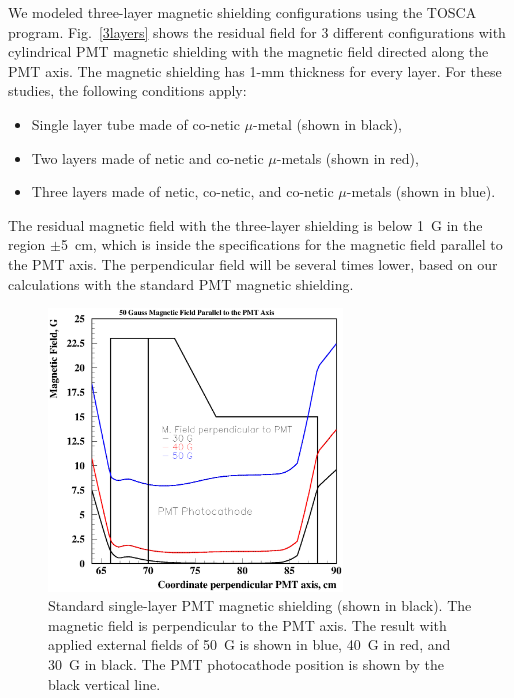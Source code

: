 We modeled three-layer magnetic shielding configurations using the 
TOSCA program.  Fig.~\ref{3layers} shows the residual field for 3 
different configurations with cylindrical PMT magnetic shielding with 
the magnetic field directed along the PMT axis.  The magnetic shielding 
has 1-mm thickness for every layer.  For these studies, the following
conditions apply:

\begin{itemize}
\item Single layer tube made of co-netic $\mu$-metal (shown in black),
\item Two layers made of netic and co-netic $\mu$-metals (shown in red),
\item Three layers made of netic, co-netic, and co-netic $\mu$-metals 
(shown in blue).
\end{itemize}

The residual magnetic field with the three-layer shielding is below 1~G 
in the region $\pm$5~cm, which is inside the specifications for the
magnetic field parallel to the PMT axis.  The perpendicular field will 
be several times lower, based on our calculations with the standard PMT 
magnetic shielding.

\begin{figure}
\hspace{0.5cm}
\begin{centering}
\includegraphics[height=7.5cm]{Magnetic-shielding/shield_r_lin.eps}
\vspace{0.5cm}
\caption{\small{Standard single-layer PMT magnetic shielding (shown in 
black).  The magnetic field is perpendicular to the PMT axis.  The result 
with applied external fields of 50~G is shown in blue, 40~G in red, and 
30~G in black.  The PMT photocathode position is shown by the black 
vertical line.}}
\label{lin_r}
\end{centering}
\end{figure}


